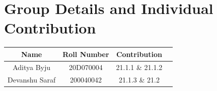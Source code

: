 \documentclass[11pt, twosides]{article}
\begin{document}
\section{Group Details and Individual Contribution}
\begin{center}
\begin{tabular}{ |c|c|c|c| } 
\hline
Name & Roll Number & Contribution \\
\hline
Aditya Byju & 20D070004 & 21.1.1 \& 21.1.2 \\ 
Devanshu Saraf & 200040042 & 21.1.3 \& 21.2 \\ 
\hline
\end{tabular}
\end{center}
\end{document}
